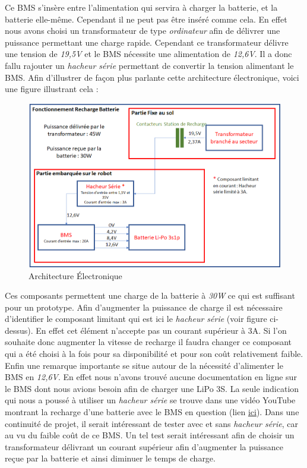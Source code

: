 \documentclass[french]{rapportENSTAB}
\begin{document}
Ce BMS s'insère entre l'alimentation qui servira à charger la batterie, et la batterie elle-même. Cependant il ne peut pas être inséré comme cela. En effet nous avons choisi un transformateur de type \textit{ordinateur} afin de délivrer une puissance permettant une charge rapide. Cependant ce transformateur délivre une tension de \textit{19,5V} et le BMS nécessite une alimentation de \textit{12,6V}. Il a donc fallu rajouter un \textit{hacheur série} permettant de convertir la tension alimentant le BMS. Afin d'illustrer de façon plus parlante cette architecture électronique, voici une figure illustrant cela :
\begin{figure}[H]
    \centering
    \includegraphics[scale=0.75]{images/station de recharge/Archi 2.png}
    \caption{Architecture Électronique}
    \label{fig:archi elec}
\end{figure}

Ces composants permettent une charge de la batterie à \textit{30W} ce qui est suffisant pour un prototype. Afin d'augmenter la puissance de charge il est nécessaire d'identifier le composant limitant qui est ici le \textit{hacheur série} (voir figure ci-dessus). En effet cet élément n'accepte pas un courant supérieur à 3A. Si l'on souhaite donc augmenter la vitesse de recharge il faudra changer ce composant qui a été choisi à la fois pour sa disponibilité et pour son coût relativement faible.\\

Enfin une remarque importante se situe autour de la nécessité d'alimenter le BMS en \textit{12,6V}. En effet nous n'avons trouvé aucune documentation en ligne sur le BMS dont nous avions besoin afin de charger une LiPo 3S. La seule indication qui nous a poussé à utiliser un \textit{hacheur série} se trouve dans une vidéo YouTube montrant la recharge d'une batterie avec le BMS en question (lien \href{https://www.youtube.com/watch?v=ySXtBuawf70}{ici}). Dans une continuité de projet, il serait intéressant de tester avec et sans \textit{hacheur série}, car au vu du faible coût de ce BMS. Un tel test serait intéressant afin de choisir un transformateur délivrant un courant supérieur afin d'augmenter la puissance reçue par la batterie et ainsi diminuer le temps de charge.
\end{document}
